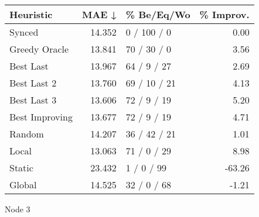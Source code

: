 \begin{tabular}{lrlr}
\toprule
\textbf{Heuristic} & \textbf{MAE ↓} & \textbf{\% Be/Eq/Wo} & \textbf{\% Improv.} \\
\midrule
            Synced &         14.352 &          0 / 100 / 0 &                0.00 \\
     Greedy Oracle &         13.841 &          70 / 30 / 0 &                3.56 \\
         Best Last &         13.967 &          64 / 9 / 27 &                2.69 \\
       Best Last 2 &         13.760 &         69 / 10 / 21 &                4.13 \\
       Best Last 3 &         13.606 &          72 / 9 / 19 &                5.20 \\
    Best Improving &         13.677 &          72 / 9 / 19 &                4.71 \\
            Random &         14.207 &         36 / 42 / 21 &                1.01 \\
             Local &         13.063 &          71 / 0 / 29 &                8.98 \\
            Static &         23.432 &           1 / 0 / 99 &              -63.26 \\
            Global &         14.525 &          32 / 0 / 68 &               -1.21 \\
\bottomrule
\end{tabular}
\caption{Node 3}
\label{tab:iid_lr01_le2_bs4_3}
